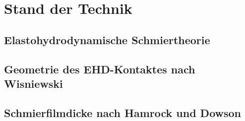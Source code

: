 \chapter{Stand der Technik}
\label{chap:stand_der_technik}

\section{Elastohydrodynamische Schmiertheorie}
\label{sec:elastohydrodynamische_schmiertheorie}

\section{Geometrie des EHD-Kontaktes nach Wisniewski}
\label{sec:geometrie_des_ehd_kontaktes_nach_wisniewski}

\section{Schmierfilmdicke nach Hamrock und Dowson}
\label{sec:schmierfilmdicke_nach_hamrock_und_dowson}


